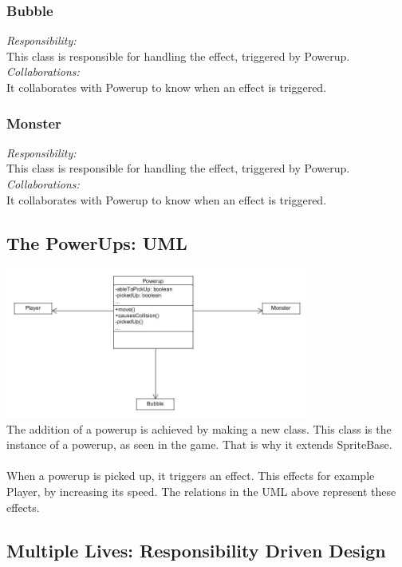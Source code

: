 \subsubsection{Bubble}
\textit{Responsibility:} \\
This class is responsible for handling the effect, triggered by Powerup. \\
\textit{Collaborations:} \\
It collaborates with Powerup to know when an effect is triggered. 

\subsubsection{Monster}
\textit{Responsibility:} \\
This class is responsible for handling the effect, triggered by Powerup. \\
\textit{Collaborations:} \\
It collaborates with Powerup to know when an effect is triggered. \\

\subsection{The PowerUps: UML}

\includegraphics[width=100mm]{uml_powerups.jpg}\\[1cm]
The addition of a powerup is achieved by making a new class. This class is the instance of a powerup, as seen in the game. That is why it extends SpriteBase. 
\\\\
When a powerup is picked up, it triggers an effect. This effects for example Player, by increasing its speed. The relations in the UML above represent these effects.


\subsection{Multiple Lives: Responsibility Driven Design}

